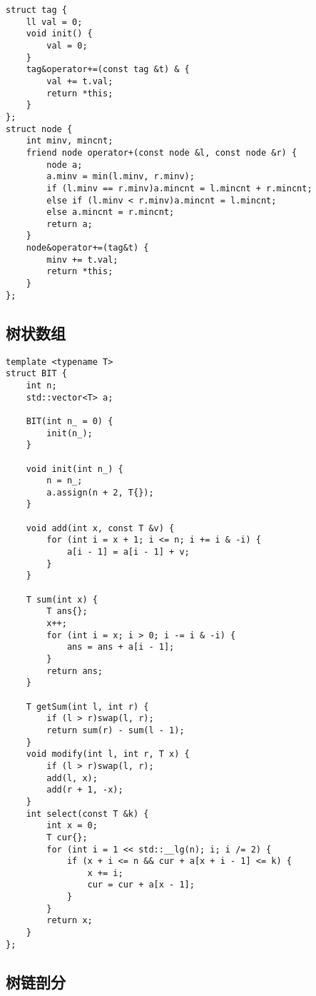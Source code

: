 \documentclass[a4paper,10pt]{article}
\begin{document}
\noindent\begin{lstlisting}
struct tag {
    ll val = 0;
    void init() {
        val = 0;
    }
    tag&operator+=(const tag &t) & {
        val += t.val;
        return *this;
    }
};
struct node {
    int minv, mincnt;
    friend node operator+(const node &l, const node &r) {
        node a;
        a.minv = min(l.minv, r.minv);
        if (l.minv == r.minv)a.mincnt = l.mincnt + r.mincnt;
        else if (l.minv < r.minv)a.mincnt = l.mincnt;
        else a.mincnt = r.mincnt;
        return a;
    }
    node&operator+=(tag&t) {
        minv += t.val;
        return *this;
    }
};\end{lstlisting}

\subsection{树状数组}
\thispagestyle{fancy}

\noindent\begin{lstlisting}
template <typename T>
struct BIT {
    int n;
    std::vector<T> a;

    BIT(int n_ = 0) {
        init(n_);
    }

    void init(int n_) {
        n = n_;
        a.assign(n + 2, T{});
    }

    void add(int x, const T &v) {
        for (int i = x + 1; i <= n; i += i & -i) {
            a[i - 1] = a[i - 1] + v;
        }
    }

    T sum(int x) {
        T ans{};
        x++;
        for (int i = x; i > 0; i -= i & -i) {
            ans = ans + a[i - 1];
        }
        return ans;
    }

    T getSum(int l, int r) {
        if (l > r)swap(l, r);
        return sum(r) - sum(l - 1);
    }
    void modify(int l, int r, T x) {
        if (l > r)swap(l, r);
        add(l, x);
        add(r + 1, -x);
    }
    int select(const T &k) {
        int x = 0;
        T cur{};
        for (int i = 1 << std::__lg(n); i; i /= 2) {
            if (x + i <= n && cur + a[x + i - 1] <= k) {
                x += i;
                cur = cur + a[x - 1];
            }
        }
        return x;
    }
};\end{lstlisting}

\subsection{树链剖分}
\thispagestyle{fancy}
\end{document}
